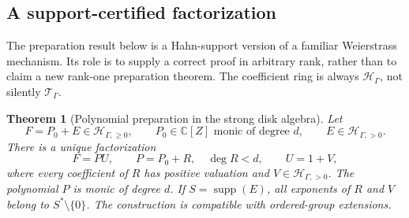 \documentclass[11pt,letterpaper]{article}
\numberwithin{equation}{section}
\newtheorem{theorem}{Theorem}[section]
\theoremstyle{definition}
\theoremstyle{remark}
\newcommand{\C}{\mathbb C}
\newcommand{\supp}{\operatorname{supp}}
\begin{document}
\subsection{A support-certified factorization}
The preparation result below is a Hahn-support version of a familiar
Weierstrass mechanism. Its role is to supply a correct proof in arbitrary
rank, rather than to claim a new rank-one preparation theorem. The coefficient
ring is always $\mathcal H_\Gamma$, not silently $\mathcal T_\Gamma$.

\begin{theorem}[Polynomial preparation in the strong disk algebra]
\label{thm:preparation}
Let
\[
 F=P_0+E\in\mathcal H_{\Gamma,\ge0},\qquad
 P_0\in\C[Z]\text{ monic of degree }d,\qquad
 E\in\mathcal H_{\Gamma,>0}.
\]
There is a unique factorization
\begin{equation}\label{eq:preparation}
 F=P U,
 \qquad P=P_0+R,\quad \deg R<d,
 \qquad U=1+V,
\end{equation}
where every coefficient of $R$ has positive valuation and
$V\in\mathcal H_{\Gamma,>0}$. The polynomial $P$ is monic of degree $d$.
If $S=\supp(E)$, all exponents of $R$ and $V$ belong to
$S^*\setminus\{0\}$. The construction is compatible with ordered-group
extensions.
\end{theorem}
\end{document}
